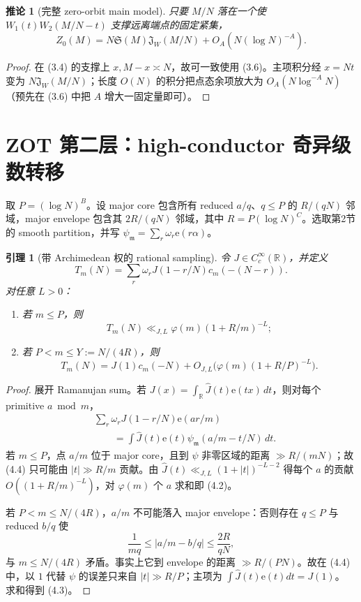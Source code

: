 \documentclass[11pt,a4paper]{ctexart}
\newtheorem{lemma}[theorem]{引理}
\newtheorem{corollary}[theorem]{推论}
\theoremstyle{definition}
\newcommand{\e}{\mathrm e}
\newcommand{\1}{\mathbf 1}
\begin{document}
\begin{corollary}[完整 zero-orbit main model]
只要 $M/N$ 落在一个使 $W_1(t)W_2(M/N-t)$ 支撑远离端点的固定紧集，
\[
\boxed{Z_0(M)=N\mathfrak S(M)\mathfrak J_W(M/N)
+O_A(N(\log N)^{-A}).}                                 \tag{3.17}
\]
\end{corollary}

\begin{proof}
在 (3.4) 的支撑上 $x,M-x\asymp N$，故可一致使用 (3.6)。主项积分经
$x=Nt$ 变为 $N\mathfrak J_W(M/N)$；长度 $O(N)$ 的积分把点态余项放大为
$O_A(N\log^{-A}N)$（预先在 (3.6) 中把 $A$ 增大一固定量即可）。
\end{proof}

\section{ZOT 第二层：high-conductor 奇异级数转移}

取 $P=(\log N)^B$。设 major core 包含所有 reduced $a/q$、$q\le P$ 的
$R/(qN)$ 邻域，major envelope 包含其 $2R/(qN)$ 邻域，其中
$R=P(\log N)^C$。选取第2节的 smooth partition，并写
$\psi_{\mathfrak m}=\sum_r\omega_r\e(r\alpha)$。

\begin{lemma}[带 Archimedean 权的 rational sampling]
令 $J\in C_c^\infty(\mathbb R)$，并定义
\[
T_m(N)=\sum_r\omega_rJ(1-r/N)c_m(-(N-r)).               \tag{4.1}
\]
对任意 $L>0$：
\begin{enumerate}[label=\textup{(\roman*)}]
\item 若 $m\le P$，则
\[
T_m(N)\ll_{J,L}\varphi(m)(1+R/m)^{-L};                 \tag{4.2}
\]
\item 若 $P<m\le Y:=N/(4R)$，则
\[
T_m(N)=J(1)c_m(-N)
+O_{J,L}\bigl(\varphi(m)(1+R/P)^{-L}\bigr).            \tag{4.3}
\]
\end{enumerate}
\end{lemma}

\begin{proof}
展开 Ramanujan sum。若
$J(x)=\int_{\mathbb R}\widehat J(t)\e(tx)\,dt$，则对每个 primitive
$a\bmod m$，
\begin{align*}
&\sum_r\omega_rJ(1-r/N)\e(ar/m)\\
&\qquad=\int\widehat J(t)\e(t)
\psi_{\mathfrak m}(a/m-t/N)\,dt.                       \tag{4.4}
\end{align*}
若 $m\le P$，点 $a/m$ 位于 major core，且到 $\psi$ 非零区域的距离
$\gg R/(mN)$；故 (4.4) 只可能由 $|t|\gg R/m$ 贡献。由
$\widehat J(t)\ll_{J,L}(1+|t|)^{-L-2}$ 得每个 $a$ 的贡献
$O((1+R/m)^{-L})$，对 $\varphi(m)$ 个 $a$ 求和即 (4.2)。

若 $P<m\le N/(4R)$，$a/m$ 不可能落入 major envelope：否则存在
$q\le P$ 与 reduced $b/q$ 使
\[
\frac1{mq}\le|a/m-b/q|\le\frac{2R}{qN},
\]
与 $m\le N/(4R)$ 矛盾。事实上它到 envelope 的距离
$\gg R/(PN)$。故在 (4.4) 中，以 $1$ 代替 $\psi$ 的误差只来自
$|t|\gg R/P$；主项为 $\int\widehat J(t)\e(t)dt=J(1)$。
求和得到 (4.3)。
\end{proof}
\end{document}
